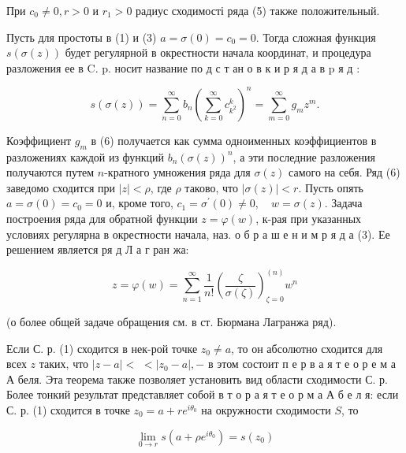 \documentclass[10pt]{article}
\begin{document}
При $c_{0} \neq 0, r>0$ и $r_{1}>0$ радиус сходимості ряда (5) также положительный.



Пусть для простоты в (1) и (3) $a=\sigma(0)=c_{0}=0$. Тогда сложная функция $s(\sigma(z))$ будет регулярной в окрестности начала координат, и процедура разложения ее в C. p. носит название по д с т ан о в к и р я д а в $\mathrm{p}$ я д :



\[

s(\sigma(z))=\sum_{n=0}^{\infty} b_{n}\left(\sum_{k=0}^{\infty} c_{k^{2}}^{k}\right)^{n}=\sum_{m=0}^{\infty} g_{m} z^{m} .

\]



Коэффициент $g_{m}$ в (6) получается как сумма одноименных коэффициентов в разложениях каждой из функций $b_{n}(\sigma(z))^{n}$, а эти последние разложения получаются путем $n$-кратного умножения ряда для $\sigma(z)$ самого на себя. Ряд (6) заведомо сходится при $|z|<\rho$, где $\rho$ таково, что $|\sigma(z)|<r$. Пусть опять $a=\sigma(0)=c_{0}=0$ и, кроме того, $c_{1}=\sigma^{\prime}(0) \neq 0, \quad w=\sigma(z)$. Задача построения ряда для обратной функции $z=\varphi(w)$, к-рая при указанных условиях регулярна в окрестности начала, наз. о б р а ш е н и м р я д а (3). Ее решением является ря д Л а г ран жа:



\[

z=\varphi(w)=\sum_{n=1}^{\infty} \frac{1}{n !}\left(\frac{\zeta}{\sigma(\zeta)}\right)_{\zeta=0}^{(n)} w^{n}

\]



(о более общей задаче обращения см. в ст. Бюрмана Лагранжа ряд).



Если С. р. (1) сходится в нек-рой точке $z_{0} \neq a$, то он абсолютно сходится для всех $z$ таких, что $|z-a|<$ $<\left|z_{0}-a\right|,-$ в этом состоит п е р в а я т е о р е м а А беля. Эта теорема также позволяет установить вид области сходимости С. р. Более тонкий результат представляет собой в т о р а я т е о р м а А б е л я: если С. р. (1) сходится в точке $z_{0}=a+r e^{i \theta_{0}}$ на окружности сходимости $S$, то



\[

\lim _{0 \rightarrow r} s\left(a+\rho e^{i \theta_{0}}\right)=s\left(z_{0}\right)

\]
\end{document}
